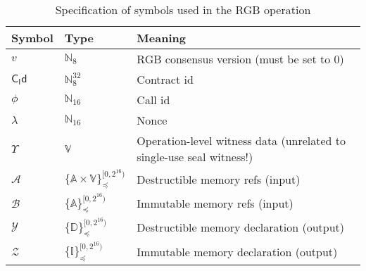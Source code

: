 \documentclass[9pt,oneside]{amsart}
\begin{document}
\begin{table}[h]
\centering
\caption{Specification of symbols used in the RGB operation}\label{tab:op}
\begin{tabular}{ l l l }
\toprule
Symbol & Type & Meaning \\
\midrule
$v$ & $\mathbb{N}_8$ & RGB consensus version (must be set to $0$) \\
$\mathsf{C_Id}$ & $\mathbb{N}_8^{32}$ & Contract id \\
$\phi$ & $\mathbb{N}_{16}$ & Call id \\
$\lambda$ & $\mathbb{N}_{16}$ & Nonce \\
$\Upsilon$ & $\mathbb{V}$ & Operation-level witness data (unrelated to single-use seal witness!) \\
$\mathcal{A}$ & $\{\mathbb{A} \times \mathbb{V}\}_\preceq^{[0, 2^{16})}$ & Destructible memory refs (input) \\
$\mathcal{B}$ & $\{\mathbb{A}\}_\preceq^{[0, 2^{16})}$ & Immutable memory refs (input) \\
$\mathcal{Y}$ & $\{\mathbb{D}\}_\preceq^{[0, 2^{16})}$ & Destructible memory declaration (output) \\
$\mathcal{Z}$ & $\{\mathbb{I}\}_\preceq^{[0, 2^{16})}$ & Immutable memory declaration (output) \\
\bottomrule
\end{tabular}
\end{table}
\end{document}
